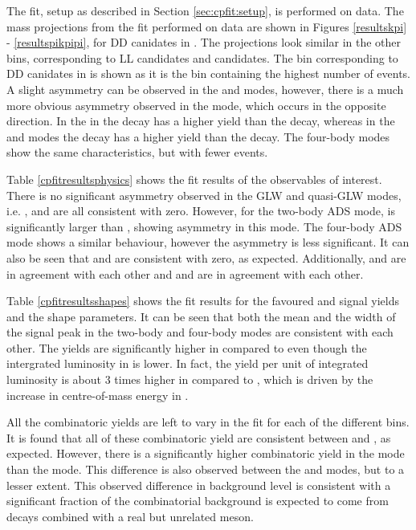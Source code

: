 The \CP fit, setup as described in Section \ref{sec:cpfit:setup}, is performed on data. The mass projections from the \CP fit performed on data are shown in Figures \ref{resultskpi} - \ref{resultspikpipi}, for DD canidates in \runtwo. The projections look similar in the other bins, corresponding to LL candidates and \runone candidates. The bin corresponding to DD canidates in \runtwo is shown as it is the bin containing the highest number of events. A slight asymmetry can be observed in the \kk and \pipi modes, however, there is a much more obvious asymmetry observed in the \pik mode, which occurs in the opposite direction. In the \pik in the \Bp decay has a higher yield than the \Bm decay, whereas in the \kk and \pipi modes the \Bm decay has a higher yield than the \Bp decay. The four-body modes show the same characteristics, but with fewer events.

Table \ref{cpfitresultsphysics} shows the \CP fit results of the \CP observables of interest. There is no significant asymmetry observed in the GLW and quasi-GLW modes, i.e. \Akk, \Apipi and \Apipipipi are all consistent with zero. However, for the two-body ADS mode, \Rptwo is significantly larger than \Rmtwo, showing asymmetry in this mode. The four-body ADS mode shows a similar behaviour, however the asymmetry is less significant. It can also be seen that \Akpi and \Akpipipi are consistent with zero, as expected. Additionally, \Akk and \Apipi are in agreement with each other and \Rkk and \Rpipi are in agreement with each other. 

Table \ref{cpfitresultsshapes} shows the fit results for the favoured \kpi and \kpipipi signal yields and the shape parameters. It can be seen that both the mean and the width of the signal peak in the two-body and four-body modes are consistent with each other. The yields are significantly higher in \runtwo compared to \runone even though the intergrated luminosity in \runtwo is lower. In fact, the yield per unit of integrated luminosity is about 3 times higher in \runone compared to \runtwo, which is driven by the increase in centre-of-mass energy in \runtwo.

All the combinatoric yields are left to vary in the \CP fit for each of the different bins. It is found that all of these combinatoric yield are consistent between \Bm and \Bp, as expected. However, there is a significantly higher combinatoric yield in the \kpi mode than the \pik mode. This difference is also observed between the \kpipipi and \pikpipi modes, but to a lesser extent. This observed difference in background level is consistent with a significant fraction of the combinatorial background is expected to come from  decays combined with a real but unrelated \KS meson. 

